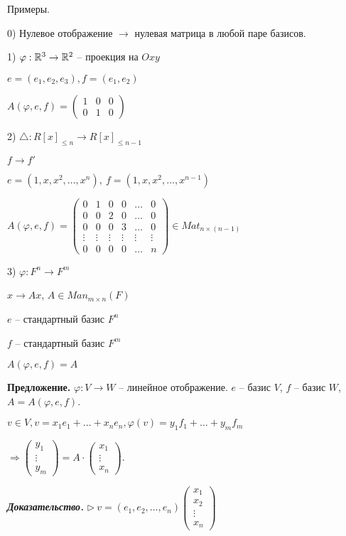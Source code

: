 \bigskip
Примеры.

0) Нулевое отображение $\rightarrow$ нулевая матрица в любой паре базисов.

1) $\varphi : \mathbb{R}^3 \rightarrow \mathbb{R}^2$ -- проекция на $Oxy$

$e = (e_1, e_2, e_3), f = (e_1, e_2)$

$A(\varphi, e, f) = \begin{pmatrix} 1 & 0 & 0 \\ 0 & 1 & 0 \end{pmatrix}$

2) $\triangle : R[x]_{\leq n} \rightarrow R[x]_{\leq n-1}$

$f \rightarrow f'$

$e = (1, x, x^2, \dots, x^n), \ f = (1, x, x^2, \dots, x^{n-1})$

$A(\varphi, e, f) = \begin{pmatrix} 0 & 1 & 0 & 0 & \dots & 0 \\ 0 & 0 & 2 & 0 & \dots & 0 \\ 0 & 0 & 0 & 3 & \dots & 0 \\ \vdots & \vdots & \vdots & \vdots & \vdots & \vdots \\ 0 & 0 & 0 & 0 & \dots & n \end{pmatrix} \in Mat_{n \times (n-1)}$

3) $\varphi : F^n \rightarrow F^m$

$x \rightarrow Ax$, $A \in Man_{m \times n} (F)$

$e$ -- стандартный базис $F^n$

$f$ -- стандартный базис $F^m$

$A(\varphi, e, f) = A$

\bigskip
\textbf{Предложение.} $\varphi : V \rightarrow W$ -- линейное отображение. $e$ -- базис $V$, $f$ -- базис $W$, $A = A(\varphi, e, f)$.

$v \in V, v = x_1 e_1 + \dots + x_n e_n, \varphi(v) = y_1 f_1 + \dots + y_m f_m$

$\Rightarrow \begin{pmatrix} y_1 \\ \vdots \\ y_m \end{pmatrix} = A \cdot \begin{pmatrix} x_1 \\ \vdots \\ x_n \end{pmatrix}$.

\bigskip
\textbf{\textit{Доказательство.}} $\rhd \ v = (e_1, e_2, \dots, e_n) \begin{pmatrix} x_1 \\ x_2 \\ \vdots \\ x_n \end{pmatrix}$

